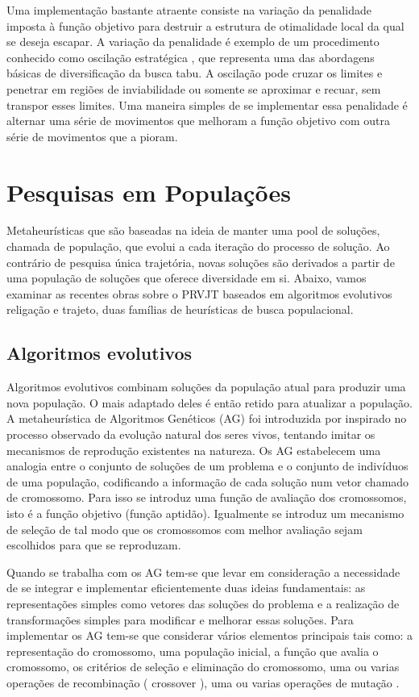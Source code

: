 Uma implementação bastante atraente consiste na variação da penalidade imposta à função objetivo para destruir a estrutura de otimalidade local da qual se deseja escapar. A variação da penalidade é exemplo de um procedimento conhecido como oscilação estratégica , que representa uma das abordagens básicas de diversificação da busca tabu. A oscilação pode cruzar os limites e penetrar em regiões de inviabilidade ou somente se aproximar e recuar, sem transpor esses limites. Uma maneira simples de se implementar essa penalidade é alternar uma série de movimentos que melhoram a função objetivo com outra série de movimentos que a pioram. 
 

\section{Pesquisas em Populações}

Metaheurísticas que são baseadas na ideia de manter uma pool de soluções, chamada de população, que evolui a cada iteração do processo de solução. Ao contrário de pesquisa única trajetória, novas soluções são derivados a partir de uma população de soluções que oferece diversidade em si. Abaixo, vamos examinar as recentes obras sobre o PRVJT baseados em algoritmos evolutivos religação e trajeto, duas famílias de heurísticas de busca populacional.
 

\subsection{Algoritmos evolutivos}

Algoritmos evolutivos combinam soluções da população atual para produzir uma nova população. O mais adaptado deles é então retido para atualizar a população. A metaheurística de Algoritmos Genéticos (AG) foi introduzida por \cite{holland75} inspirado no processo observado da evolução natural dos seres vivos, tentando imitar os mecanismos de reprodução existentes na natureza. Os AG estabelecem uma analogia entre o conjunto de soluções de um problema e o conjunto de indivíduos de uma população, codificando a informação de cada solução num vetor chamado de cromossomo. Para isso se introduz uma função de avaliação dos cromossomos, isto é a função objetivo (função aptidão). Igualmente se introduz um mecanismo de seleção de tal modo que os cromossomos com melhor avaliação sejam escolhidos para que se reproduzam. 

Quando se trabalha com os AG tem-se que levar em consideração a necessidade de se integrar e implementar eficientemente duas ideias fundamentais: as representações simples como vetores das soluções do problema e a realização de transformações simples para modificar e melhorar essas soluções. Para implementar os AG tem-se que considerar vários elementos principais tais como: a representação do cromossomo, uma população inicial, a função que avalia o cromossomo, os critérios de seleção e eliminação do cromossomo, uma ou varias operações de recombinação ( crossover ), uma ou varias operações de mutação . 


